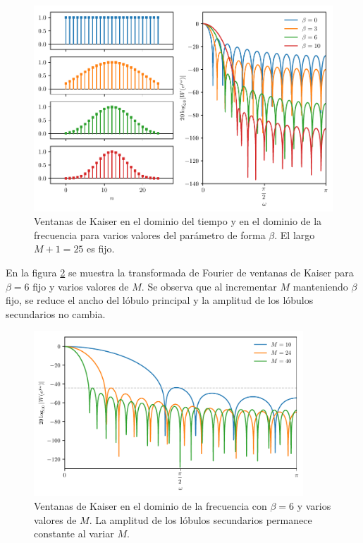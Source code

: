 \documentclass[a4paper]{report}
\begin{document}
\begin{figure}[!htb]
 \begin{center}
 \includegraphics[width=1\textwidth]{figuras/filter_design_windowing_kaiser_windows_and_spectrums_beta.pdf}
 \caption{\label{fig:filter_design_windowing_kaiser_windows_and_spectrums_beta} Ventanas de  Kaiser en el dominio del tiempo y en el dominio de la frecuencia para varios valores del parámetro de forma \(\beta\). El largo \(M+1=25\) es fijo.}
 \end{center}
\end{figure}
En la figura \ref{fig:filter_design_windowing_kaiser_windows_and_spectrums_M} se muestra la transformada de Fourier de ventanas de Kaiser para \(\beta=6\) fijo y varios valores de \(M\). Se observa que al incrementar \(M\) manteniendo \(\beta\) fijo, se reduce el ancho del lóbulo principal y la amplitud de los lóbulos secundarios no cambia. 
\begin{figure}[!htb]
 \begin{center}
 \includegraphics[width=0.9\textwidth]{figuras/filter_design_windowing_kaiser_windows_and_spectrums_M.pdf}
 \caption{\label{fig:filter_design_windowing_kaiser_windows_and_spectrums_M} Ventanas de Kaiser en el dominio de la frecuencia con \(\beta=6\) y varios valores de \(M\). La amplitud de los lóbulos secundarios permanece constante al variar \(M\).}
 \end{center}
\end{figure}
\end{document}
